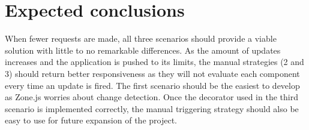 \section{Expected conclusions}
\label{sec:verwachte_conclusies}
When fewer requests are made, all three scenarios should provide a viable solution with little to no remarkable differences.
As the amount of updates increases and the application is pushed to its limits, the manual strategies (2 and 3) should return better responsiveness as they will not evaluate each component every time an update is fired.
The first scenario should be the easiest to develop as Zone.js worries about change detection.
Once the decorator used in the third scenario is implemented correctly, the manual triggering strategy should also be easy to use for future expansion of the project.



	
